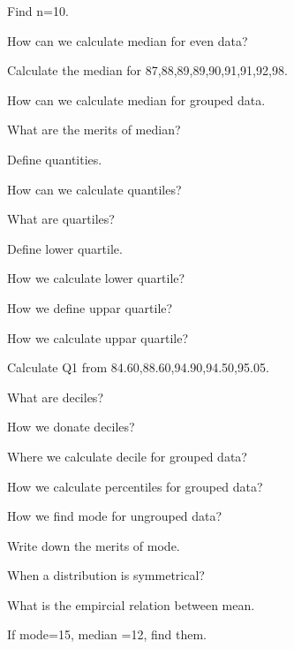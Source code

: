 \documentclass[11pt,a4paper]{article}
\begin{document}
\begin{shortlist}
\item Find n=10.

\item How can we calculate median for even data?

\item Calculate the median for 87,88,89,89,90,91,91,92,98.

\item How can we calculate median for grouped data.

\item What are the merits of median?

\item Define quantities.

\item How can we calculate quantiles?

\item What are quartiles?

\item Define lower quartile.

\item How we calculate lower quartile?

\item How we define uppar quartile?

\item How we calculate uppar quartile?

\item Calculate Q1 from 84.60,88.60,94.90,94.50,95.05.

\item What are deciles?

\item How we donate deciles?

\item Where we calculate decile for grouped data?

\item How we calculate percentiles for grouped data?

\item How we find mode for ungrouped data?

\item Write down the merits of mode.

\item When a distribution is symmetrical?

\item What is the empircial relation between mean.

\item If mode=15, median =12, find them.


\end{shortlist}
\end{document}
